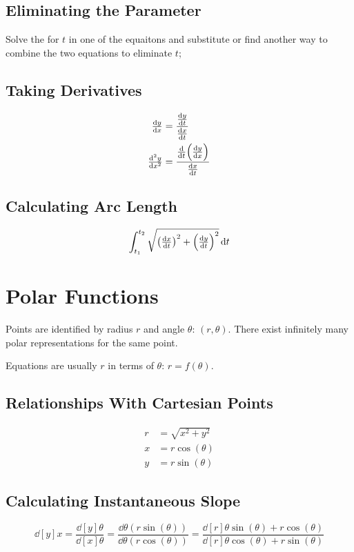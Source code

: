 \documentclass[12pt]{article}
\DeclarePairedDelimiter\paren{(}{)}
\newcommand*{\D}[1]{\mathop{}\!\mathrm{d}#1}
\newcommand*{\fixmath}{%
  \makebox{}\vspace{\glueexpr-\baselineskip-\abovedisplayskip}}
\newenvironment{fixaskip}{\setlength{\abovedisplayskip}{0pt}\fixmath%
  \ignorespaces}{\ignorespacesafterend}
\newenvironment{fixskip}{\setlength{\abovedisplayskip}{0pt}%
  \setlength{\belowdisplayskip}{0pt}\fixmath\ignorespaces}%
  {\ignorespacesafterend}
\begin{document}
\subsection*{Eliminating the Parameter}
Solve the for \(t\) in one of the equaitons and substitute or find another way
to combine the two equations to eliminate \(t\);
\subsection*{Taking Derivatives}
\begin{fixaskip}
  \begin{align*}
    \dd[y]{x} &= \frac{\dd[y]{t}}{\dd[x]{t}}\\
    \dd[2][y]{x} &= \frac{\dd{t}\paren*{\dd[y]{x}}}{\dd[x]{t}}
  \end{align*}
\end{fixaskip}
\subsection*{Calculating Arc Length}
\begin{fixskip}
  \[
    \int_{t_1}^{t_2}\sqrt{\paren*{\dd[x]{t}}^2 + \paren*{\dd[y]{t}}^2}\D{t}
  \]
\end{fixskip}
\section*{Polar Functions}
Points are identified by radius \(r\) and angle \(\theta\): \((r,\theta)\).
There exist infinitely many polar representations for the same point.

Equations are usually \(r\) in terms of \(\theta\): \(r = f(\theta)\).
\subsection*{Relationships With Cartesian Points}
\begin{fixskip}
  \begin{align*}
    r &= \sqrt{x^2+y^2}\\
    x &= r\cos(\theta)\\
    y &= r\sin(\theta)
  \end{align*}
\end{fixskip}
\subsection*{Calculating Instantaneous Slope}
\begin{fixskip}
  \[
    \dd[y]{x} = \frac{\dd[y]{\theta}}{\dd[x]{\theta}}
    = \frac{\dd{\theta}(r\sin(\theta))}{\dd{\theta}(r\cos(\theta))}
    = \frac{\dd[r]{\theta}\sin(\theta) + r\cos(\theta)}%
      {\dd[r]{\theta}\cos(\theta) + r\sin(\theta)}
  \]
\end{fixskip}
\end{document}
